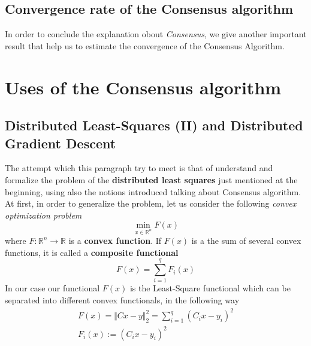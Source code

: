 \subsection{Convergence rate of the Consensus algorithm}
In order to conclude the explanation obout \textit{Consensus}, we give another important result that help us to estimate the convergence of the Consensus Algorithm.\\

\hspace*{-5mm}
%


\section{Uses of the Consensus algorithm}

\subsection{Distributed Least-Squares (II) and Distributed Gradient Descent}
The attempt which this paragraph try to meet is that of understand and formalize the problem of the \textbf{distributed least squares} just mentioned at the beginning, using also the notions introduced talking about Consensus algorithm.\\
At first, in order to generalize the problem, let us consider the following \textit{convex optimization problem}
\begin{equation}
    \min_{x\in\mathbb{R}^n} F(x)
\end{equation}
where $F:\mathbb{R}^n\to\mathbb{R}$ is a \textbf{convex function}. If $F(x)$ is a the sum of several convex functions, it is called a \textbf{composite functional}
\begin{equation}
    F(x)=\sum_{i=1}^q {F_i(x)}
\end{equation}
In our case our functional $F(x)$ is the Least-Square functional which can be separated into different convex functionals, in the following way
\begin{align}
    F(x)=\Vert Cx-y \Vert_2^2=\sum_{i=1}^q (C_ix-y_i)^2\\
    F_i(x):=(C_ix-y_i)^2
\end{align}

